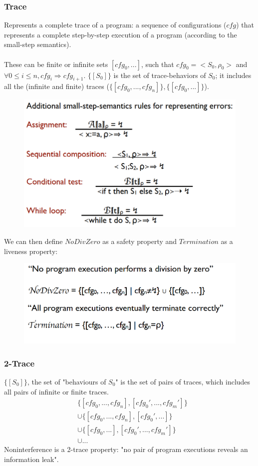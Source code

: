 \documentclass[10pt,a4paper]{report}
\begin{document}
\subsubsection{Trace}
Represents a complete trace of a program: a sequence of configurations ($cfg$) that represents a complete step-by-step execution of a program (according to the small-step semantics).\\
\\
These can be finite or infinite sets $[cfg_0, ...]$, such that $cfg_0 = <S_0, \rho_0>$ and $\forall 0 \leq i \leq n, cfg_i \Rightarrow cfg_{i+1}$. $\{[S_0]\}$ is the set of trace-behaviors of $S_0$; it includes all the (infinite and finite) traces ($\{[cfg_0, ..., cfg_n]\}, \{[cfg_0, ...]\}$).
\begin{figure}[H]
\centering
\includegraphics[scale=0.4]{37.png}
\end{figure}
We can then define $NoDivZero$ as a safety property and $Termination$ as a liveness property:
\begin{figure}[H]
\centering
\includegraphics[scale=0.4]{38.png}
\end{figure}
\subsubsection{2-Trace}
$\{[S_0]\}$, the set of "behaviours of $S_0$" is the set of pairs of traces, which includes all pairs of infinite or finite traces.
\begin{align}
&\{[cfg_0, ..., cfg_n], [cfg_0', ..., cfg_m']\}\\
&\cup \{[cfg_0, ..., cfg_n], [cfg_0', ...]\}\\
&\cup \{[cfg_0, ...], [cfg_0', ..., cfg_m']\}\\
& \cup ...
\end{align}
Noninterference is a 2-trace property: "no pair of program executions reveals an information leak".
\end{document}
